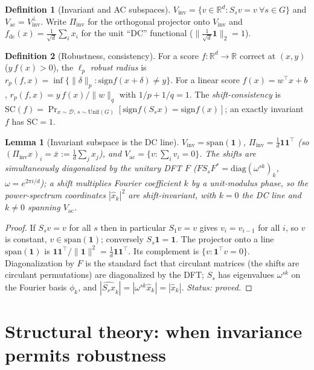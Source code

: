 \documentclass[11pt]{article}
\theoremstyle{plain}
\newtheorem{lemma}{Lemma}
\theoremstyle{definition}
\newtheorem{definition}{Definition}
\theoremstyle{remark}
\newcommand{\R}{\mathbb{R}}
\newcommand{\fdc}{f_{\mathrm{dc}}}
\newcommand{\Vinv}{V_{\mathrm{inv}}}
\newcommand{\Vac}{V_{\mathrm{ac}}}
\newcommand{\one}{\mathbf 1}
\newcommand{\Piinv}{\Pi_{\mathrm{inv}}}
\newcommand{\sign}{\mathrm{sign}}
\begin{document}
\begin{definition}[Invariant and AC subspaces]
$\Vinv=\{v\in\R^d: S_sv=v\ \forall s\in G\}$ and $\Vac=\Vinv^{\perp}$. Write $\Piinv$ for the orthogonal projector onto $\Vinv$ and $\fdc(x)=\tfrac1{\sqrt d}\sum_i x_i$ for the unit ``DC'' functional ($\|\tfrac1{\sqrt d}\one\|_2=1$).
\end{definition}

\begin{definition}[Robustness, consistency]
For a score $f:\R^d\to\R$ correct at $(x,y)$ ($y\,f(x)>0$), the $\ell_p$ \emph{robust radius} is $r_p(f,x)=\inf\{\|\delta\|_p:\sign f(x+\delta)\neq y\}$. For a linear score $f(x)=w^\top x+b$, $r_p(f,x)=y\,f(x)/\|w\|_q$ with $1/p+1/q=1$. The \emph{shift-consistency} is $\mathrm{SC}(f)=\Pr_{x\sim\mathcal D,\,s\sim\mathrm{Unif}(G)}[\sign f(S_sx)=\sign f(x)]$; an exactly invariant $f$ has $\mathrm{SC}=1$.
\end{definition}

\begin{lemma}[Invariant subspace is the DC line]\label{lem:proj}
$\Vinv=\mathrm{span}(\one)$, $\Piinv=\tfrac1d\one\one^\top$ (so $(\Piinv x)_i=\bar x:=\tfrac1d\sum_j x_j$), and $\Vac=\{v:\sum_i v_i=0\}$. The shifts are simultaneously diagonalized by the unitary DFT $F$ ($F S_s F^\ast=\mathrm{diag}(\omega^{sk})_k$, $\omega=e^{2\pi i/d}$); a shift multiplies Fourier coefficient $k$ by a unit-modulus phase, so the power-spectrum coordinates $|\hat x_k|^2$ are shift-invariant, with $k=0$ the DC line and $k\neq0$ spanning $\Vac$.
\end{lemma}
\begin{proof}
If $S_sv=v$ for all $s$ then in particular $S_1v=v$ gives $v_i=v_{i-1}$ for all $i$, so $v$ is constant, $v\in\mathrm{span}(\one)$; conversely $S_s\one=\one$. The projector onto a line $\mathrm{span}(\one)$ is $\one\one^\top/\|\one\|^2=\tfrac1d\one\one^\top$. Its complement is $\{v:\one^\top v=0\}$. Diagonalization by $F$ is the standard fact that circulant matrices (the shifts are circulant permutations) are diagonalized by the DFT; $S_s$ has eigenvalues $\omega^{sk}$ on the Fourier basis $\phi_k$, and $|\widehat{S_sx}_k|=|\omega^{sk}\hat x_k|=|\hat x_k|$. \emph{Status: proved.}
\end{proof}

\section{Structural theory: when invariance permits robustness}\label{sec:struct}
\end{document}

